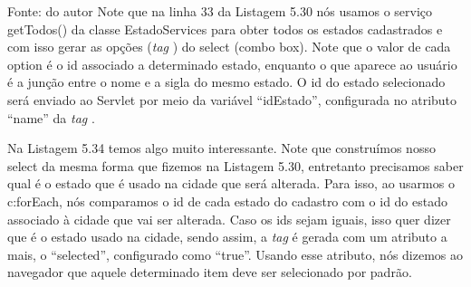  

 
Fonte: do autor
Note que na linha 33 da Listagem 5.30 nós usamos o serviço getTodos() da classe EstadoServices para obter todos os estados cadastrados e com isso gerar as opções (\textit{tag} ) do select (combo box). Note que o valor de cada option é o id associado a determinado estado, enquanto o que aparece ao usuário é a junção entre o nome e a sigla do mesmo estado. O id do estado selecionado será enviado ao Servlet por meio da variável ``idEstado'', configurada no atributo ``name'' da \textit{tag} .



Na Listagem 5.34 temos algo muito interessante. Note que construímos nosso select da mesma forma que fizemos na Listagem 5.30, entretanto precisamos saber qual é o estado que é usado na cidade que será alterada. Para isso, ao usarmos o c:forEach, nós comparamos o id de cada estado do cadastro com o id do estado associado à cidade que vai ser alterada. Caso os ids sejam iguais, isso quer dizer que é o estado usado na cidade, sendo assim, a \textit{tag}  é gerada com um atributo a mais, o ``selected'', configurado como ``true''. Usando esse atributo, nós dizemos ao navegador que aquele determinado item deve ser selecionado por padrão.

